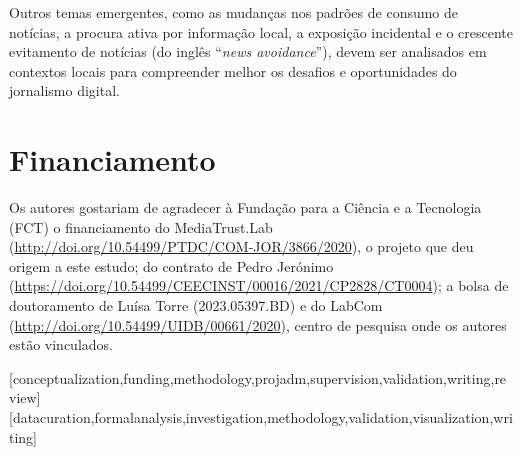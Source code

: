 \documentclass[portuguese]{textolivre}
\begin{document}
Outros temas emergentes, como as mudanças nos padrões de consumo de notícias, a procura ativa por informação local, a exposição incidental e o crescente evitamento de notícias (do inglês “\textit{news avoidance}”), devem ser analisados em contextos locais para compreender melhor os desafios e oportunidades do jornalismo digital.

\section{Financiamento}
Os autores gostariam de agradecer à Fundação para a Ciência e a Tecnologia (FCT) o financiamento do MediaTrust.Lab (\url{http://doi.org/10.54499/PTDC/COM-JOR/3866/2020}), o projeto que deu origem a este estudo; do contrato de Pedro Jerónimo (\url{https://doi.org/10.54499/CEECINST/00016/2021/CP2828/CT0004}); a bolsa de doutoramento de Luísa Torre (2023.05397.BD) e do LabCom (\url{http://doi.org/10.54499/UIDB/00661/2020}), centro de pesquisa onde os autores estão vinculados. 

\printbibliography\label{sec-bib}

\begin{contributors}
[conceptualization,funding,methodology,projadm,supervision,validation,writing,review]
[datacuration,formalanalysis,investigation,methodology,validation,visualization,writing]
\end{contributors}
\end{document}

